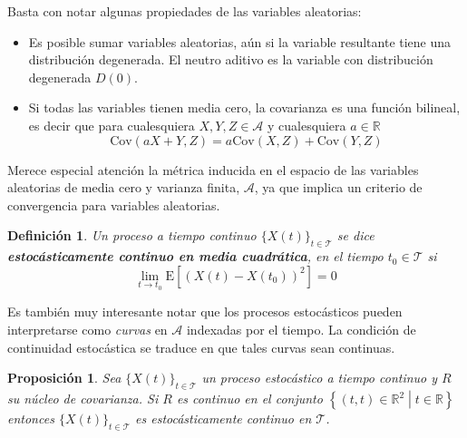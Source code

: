\documentclass[12pt,letterpaper]{book}
\newtheorem{definicion}{Definición}[chapter]
\newtheorem{proposicion}[teorema]{Proposición}
\newcommand{\R}{\mathbb{R}}
\newcommand{\E}[1]{\mathrm{E}\left[ #1 \right]}
\newcommand{\Cov}[1]{\mathrm{Cov}\left( #1 \right)}
\newcommand{\xt}{$\{X(t)\}_{t\in \mathcal{T}}$ }
\newcommand{\talque}{\mathrel{}\middle|\mathrel{}}
\begin{document}
Basta con notar algunas propiedades de las variables aleatorias:
\begin{itemize}
\item Es posible sumar variables aleatorias, aún si la variable resultante tiene una distribución degenerada. El neutro aditivo es la variable con distribución degenerada $D(0)$.
\item Si todas las variables tienen media cero, la covarianza es una función bilineal, es decir que para cualesquiera $X,Y,Z \in \mathcal{A}$ y cualesquiera $a\in \R$
\begin{equation}
\Cov{aX+Y,Z} = a\Cov{X,Z} + \Cov{Y,Z}
\end{equation}
\end{itemize}

Merece especial atención la métrica inducida en el espacio de las variables aleatorias de media cero y varianza finita, $\mathcal{A}$, ya que implica un criterio de convergencia para variables aleatorias.

\begin{definicion}%
\label{cont_est}
Un proceso a tiempo continuo \xt se dice \textbf{estocásticamente continuo en media cuadrática}, en el tiempo $t_0\in \mathcal{T}$ si
\begin{equation}
\lim_{t \rightarrow t_0} \E{\left( X(t) - X(t_0) \right)^{2}} = 0
\end{equation}
\end{definicion}

Es también muy interesante notar que los procesos estocásticos pueden interpretarse como \textit{curvas} en $\mathcal{A}$ indexadas por el tiempo.
%
La condición de continuidad estocástica se traduce en que tales curvas sean continuas.

\begin{proposicion}
Sea \xt un proceso estocástico a tiempo continuo y $R$ su núcleo de covarianza.
%
Si $R$ es continuo en el conjunto $\left\{ (t,t) \in \R^2 \talque t\in \R \right\}$ entonces \xt es estocásticamente continuo en $\mathcal{T}$.
\end{proposicion}
\end{document}
